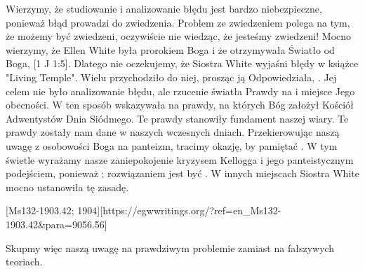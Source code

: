 Wierzymy, że studiowanie i analizowanie błędu jest bardzo niebezpieczne, ponieważ błąd prowadzi do zwiedzenia. Problem ze zwiedzeniem polega na tym, że możemy być zwiedzeni, oczywiście nie wiedząc, że jesteśmy zwiedzeni! Mocno wierzymy, że Ellen White była prorokiem Boga i że otrzymywała Światło od Boga, [1 J 1:5]. Dlatego nie oczekujemy, że Siostra White wyjaśni błędy w książce "Living Temple". Wielu przychodziło do niej, prosząc ją  Odpowiedziała, . Jej celem nie było analizowanie błędu, ale rzucenie światła Prawdy na  i miejsce Jego obecności. W ten sposób wskazywała na prawdy, na których Bóg założył Kościół Adwentystów Dnia Siódmego. Te prawdy stanowiły fundament naszej wiary. Te prawdy zostały nam dane w naszych wczesnych dniach. Przekierowując naszą uwagę z osobowości Boga na panteizm, tracimy okazję, by pamiętać . W tym świetle wyrażamy nasze zaniepokojenie kryzysem Kellogga i jego panteistycznym podejściem, ponieważ ; rozwiązaniem jest być . W innych miejscach Siostra White mocno ustanowiła tę zasadę.


[Ms132-1903.42; 1904][https://egwwritings.org/?ref=en\_Ms132-1903.42&para=9056.56]


Skupmy więc naszą uwagę na prawdziwym problemie zamiast na fałszywych teoriach.

